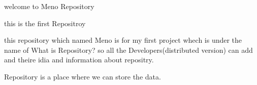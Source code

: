 welcome to Meno Repository

this is the first Repositroy 

this repository which named Meno is for my first project whech is under the name of What is 
Repository? so all the Developers(distributed version) can add and theire idia and information about repositry.

Repository is a place where we can store the data.
